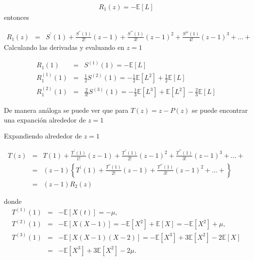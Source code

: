 \documentclass{article}
\newcommand{\esp}{\mathbb{E}}
\begin{document}
\begin{eqnarray}\label{Eq.R1}
R_{1}\left(z\right)=-\esp\left[L\right]
\end{eqnarray}
entonces

\begin{eqnarray}
R_{1}\left(z\right)&=&S^{'}\left(1\right)+\frac{S^{''}\left(1\right)}{2!}\left(z-1\right)+\frac{S^{'''}\left(1\right)}{3!}\left(z-1\right)^{2}+\frac{S^{iv}\left(1\right)}{4!}\left(z-1\right)^{3}+\ldots+
\end{eqnarray}
Calculando las derivadas y evaluando en $z=1$

\begin{eqnarray}
R_{1}\left(1\right)&=&S^{(1)}\left(1\right)=-\esp\left[L\right]\\
R_{1}^{(1)}\left(1\right)&=&\frac{1}{2}S^{(2)}\left(1\right)=-\frac{1}{2}\esp\left[L^{2}\right]+\frac{1}{2}\esp\left[L\right]\\
R_{1}^{(2)}\left(1\right)&=&\frac{2}{3!}S^{(3)}\left(1\right)
=-\frac{1}{3}\esp\left[L^{3}\right]+\esp\left[L^{2}\right]-\frac{2}{3}\esp\left[L\right]
\end{eqnarray}

De manera an\'aloga se puede ver que para $T\left(z\right)=z-P\left(z\right)$ se puede encontrar una expanci\'on alrededor de $z=1$

Expandiendo alrededor de $z=1$

\begin{eqnarray*}
T\left(z\right)&=&T\left(1\right)+\frac{T^{'}\left(1\right)}{1!}\left(z-1\right)+\frac{T^{''}\left(1\right)}{2!}\left(z-1\right)^{2}+\frac{T^{'''}\left(1\right)}{3!}\left(z-1\right)^{3}+\ldots+\\
&=&\left(z-1\right)\left\{T^{'}\left(1\right)+\frac{T^{''}\left(1\right)}{2!}\left(z-1\right)+\frac{T^{'''}\left(1\right)}{3!}\left(z-1\right)^{2}+\ldots+\right\}\\
&=&\left(z-1\right)R_{2}\left(z\right)
\end{eqnarray*}

donde 
\begin{eqnarray*}
T^{(1)}\left(1\right)&=&-\esp\left[X\left(t\right)\right]=-\mu,\\ T^{(2)}\left(1\right)&=&-\esp\left[X\left(X-1\right)\right]
=-\esp\left[X^{2}\right]+\esp\left[X\right]=-\esp\left[X^{2}\right]+\mu,\\
T^{(3)}\left(1\right)&=&-\esp\left[X\left(X-1\right)\left(X-2\right)\right]
=-\esp\left[X^{3}\right]+3\esp\left[X^{2}\right]-2\esp\left[X\right]\\
&=&-\esp\left[X^{3}\right]+3\esp\left[X^{2}\right]-2\mu.
\end{eqnarray*}
\end{document}
